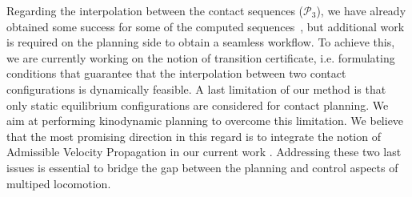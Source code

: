Regarding the interpolation between the contact sequences ($\mathcal{P}_3$), we have already obtained some success for some of the computed sequences~\citep{Carpentier2016}, but additional
work is required on the planning side to obtain a seamless workflow. To achieve this, we are currently working on the notion of transition certificate, i.e. formulating
conditions that guarantee that the interpolation between two contact configurations is dynamically feasible.
A last limitation of our method is that only static equilibrium configurations are considered for contact planning.
We aim at performing kinodynamic planning to overcome this limitation. We believe that the most promising direction in this regard is to integrate
the notion of Admissible Velocity Propagation in our current work \citep{DBLP:conf/rss/PhamCN13}.
Addressing these two last issues is essential to bridge the gap between the planning and control aspects of multiped locomotion.
